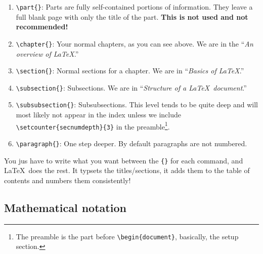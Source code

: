 \begin{enumerate}
	\item \verb|\part{}|: Parts are fully self-contained portions of information. They leave a full blank page with only the title of the part. \textbf{This is not used and not recommended!}
	\item \verb|\chapter{}|: Your normal chapters, as you can see above. We are in the ``\emph{An overview of \LaTeX }.''
	\item \verb|\section{}|: Normal sections for a chapter. We are in ``\emph{Basics of \LaTeX}.''
	\item \verb|\subsection{}|: Subsections. We are in ``\emph{Structure of a \LaTeX\ document}.''
	\item \verb|\subsubsection{}|: Subsubsections. This level tends to be quite deep and will most likely not appear in the index unless we include \verb|\setcounter{secnumdepth}{3}| in the preamble\footnote{The preamble is the part before \texttt{\textbackslash begin\{document\}}, basically, the setup section.}.
	\item \verb|\paragraph{}|: One step deeper. By default paragraphs are not numbered.
\end{enumerate}

You jus have to write what you want between the \verb|{}| for each command, and \LaTeX\ does the rest. It typsets the titles/sections, it adds them to the table of contents and numbers them consistently!

\subsection{Mathematical notation}

